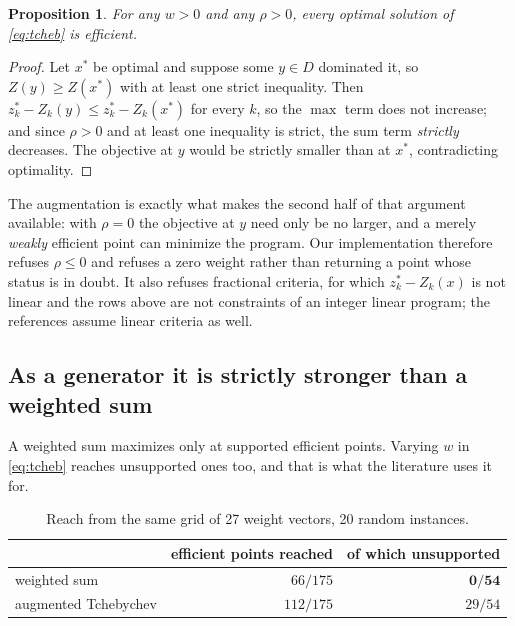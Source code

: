 \documentclass[11pt,a4paper]{article}
\newtheorem{proposition}{Proposition}
\newcommand{\Z}{Z}
\newcommand{\Dset}{D}
\begin{document}
\begin{proposition}\label{prop:tcheb}
For any $w > 0$ and any $\rho > 0$, every optimal solution of
\eqref{eq:tcheb} is efficient.
\end{proposition}

\begin{proof}
Let $x^{*}$ be optimal and suppose some $y \in \Dset$ dominated it, so
$\Z(y) \geqslant \Z(x^{*})$ with at least one strict inequality. Then
$z^{*}_k - \Z_k(y) \leqslant z^{*}_k - \Z_k(x^{*})$ for every $k$, so the
$\max$ term does not increase; and since $\rho > 0$ and at least one
inequality is strict, the sum term \emph{strictly} decreases. The objective at
$y$ would be strictly smaller than at $x^{*}$, contradicting optimality.
\end{proof}

\noindent
The augmentation is exactly what makes the second half of that argument
available: with $\rho = 0$ the objective at $y$ need only be no larger, and a
merely \emph{weakly} efficient point can minimize the program. Our
implementation therefore refuses $\rho \leqslant 0$ and refuses a zero weight
rather than returning a point whose status is in doubt. It also refuses
fractional criteria, for which $z^{*}_k - \Z_k(x)$ is not linear and the rows
above are not constraints of an integer linear program; the references
assume linear criteria as well.

\subsection{As a generator it is strictly stronger than a weighted sum}

A weighted sum maximizes only at supported efficient points. Varying $w$ in
\eqref{eq:tcheb} reaches unsupported ones too, and that is what the literature
uses it for.

\begin{table}[h]
\centering
\caption{Reach from the same grid of 27 weight vectors, 20 random instances.}
\begin{tabular}{lrr}
\toprule
 & efficient points reached & of which unsupported \\
\midrule
weighted sum         & $66 / 175$  & $\mathbf{0 / 54}$ \\
augmented Tchebychev & $112 / 175$ & $29 / 54$ \\
\bottomrule
\end{tabular}
\end{table}
\end{document}
